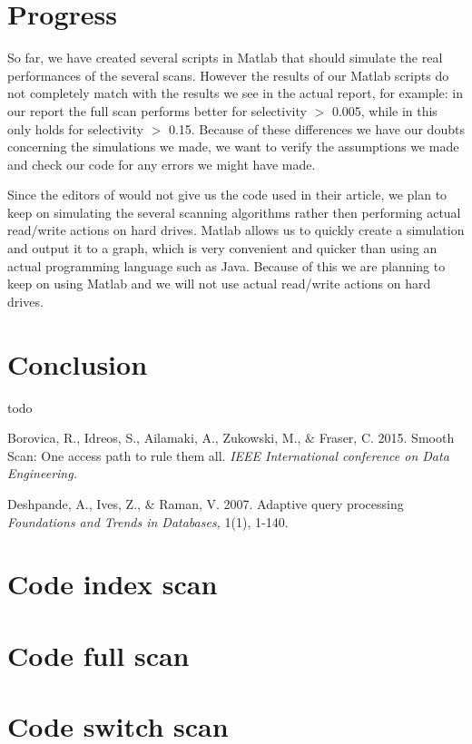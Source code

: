 \documentclass[a4paper,11pt,twoside]{article}
\begin{document}
\section{Progress}
So far, we have created several scripts in Matlab that should simulate the real performances of the several scans. However the results of our Matlab scripts do not completely match with the results we see in the actual report, for example: in our report the full scan performs better for selectivity $>$ 0.005, while in \cite{smoothscan} this only holds for selectivity $>$ 0.15. Because of these differences we have our doubts concerning the simulations we made, we want to verify the assumptions we made and check our code for any errors we might have made.

Since the editors of \cite{smoothscan} would not give us the code used in their article, we plan to keep on simulating the several scanning algorithms rather then performing actual read/write actions on hard drives. Matlab allows us to quickly create a simulation and output it to a graph, which is very convenient and quicker than using an actual programming language such as Java. Because of this we are planning to keep on using Matlab and we will not use actual read/write actions on hard drives.

\section{Conclusion}
todo

\begin{thebibliography}{9}

	 Borovica, R., Idreos, S., Ailamaki, A., Zukowski, M., $\&$ Fraser, C.
	2015.	
 	Smooth Scan: One access path to rule them all.
	\emph{IEEE International conference on Data Engineering.}

	Deshpande, A., Ives, Z., $\&$ Raman, V.
	2007.
	Adaptive query processing
	\emph{Foundations and Trends in Databases,}
	1(1), 1-140.
\end{thebibliography}
\newpage

\begin{appendices}
\section{Code index scan}
\label{appendixa}

\section{Code full scan}
\label{appendixb}

\section{Code switch scan}
\label{appendixb}

\end{appendices}
\end{document}
